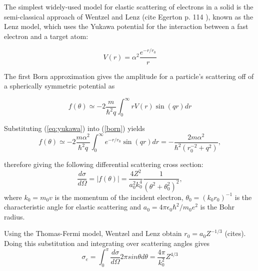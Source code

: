 \documentclass [11pt, proquest, article] {uwthesis}[2016/11/22]
\begin{document}
The simplest widely-used model for elastic scattering of electrons in a solid is the semi-classical approach of Wentzel and Lenz (cite Egerton p. 114 ), known as the Lenz model, which uses the Yukawa potential for the interaction between a fast electron and a target atom:

\begin{equation}\label{eq:yukawa} 
V(r) = \alpha^2 \frac{e^{-r/r_0}}{r}
\end{equation}


The first Born approximation gives the amplitude for a particle's scattering off of a spherically symmetric potential as

 \begin{equation}\label{born}
	f(\theta) \simeq -2 \frac{m}{\hbar^2 q} \int_0^\infty r V(r) \sin (qr) dr
\end{equation}

Substituting (\ref{eq:yukawa}) into (\ref{born}) yields 
\begin{equation}
	f(\theta) \simeq -2 \frac{m \alpha^2}{\hbar^2 q} \int_0^\infty e^{-r/r_0} \sin (qr) dr = -\frac{2m\alpha^2}{\hbar^2 (r_0^{-2} + q^2)},
\end{equation}

therefore giving the following differential scattering cross section:
$$
\frac{d\sigma}{d\Omega} = |f(\theta)| = \frac{4 Z^2}{a_0^2 k_0^4} \frac{1}{(\theta^2 + \theta_0^2)^2},
$$
where $k_0 = m_0 v$ is the momentum of the incident electron, $\theta_0 = (k_0 r_0)^{-1}$ is the characteristic angle for elastic scattering and $a_0 = 4 \pi \epsilon_0 \hbar^2/m_0 e^2$ is the Bohr radius.

Using the Thomas-Fermi model, Wentzel and Lenz obtain $r_0 = a_0 Z^{-1/3}$ (cites). Doing this substitution and integrating over scattering angles gives
\begin{equation}
\sigma_e = \int_0^\pi \frac{d\sigma}{d\Omega} 2 \pi sin \theta d \theta = \frac{4 \pi}{k_0^2} Z^{4/3}
\end{equation}
\end{document}
